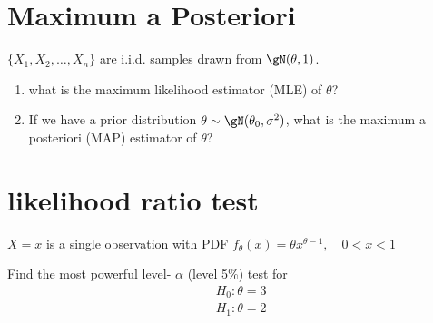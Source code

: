 \documentclass{article}%
\newif\ifwithrefs
\begin{document}
\section{Maximum a Posteriori}
$\{X_1,X_2,\ldots,X_n\}$ are i.i.d. samples drawn from $\gN(\theta,1)$.
\begin{enumerate}
    \item what is the maximum likelihood estimator (MLE) of $\theta$?
    \item If we have a prior distribution $\theta\sim \gN(\theta_0,\sigma^2)$, what is the maximum a posteriori (MAP) estimator of $\theta$?
\end{enumerate}

\section{likelihood ratio test}
$X=x$ is a single observation with PDF $f_\theta(x)=\theta x^{\theta-1}, \quad 0<x<1$

Find the most powerful level- $\alpha$ (level 5\%) test for
$$
\begin{aligned}
& H_0: \theta=3 \\
& H_1: \theta=2
\end{aligned}
$$


\ifwithrefs
  
\fi
\end{document}
